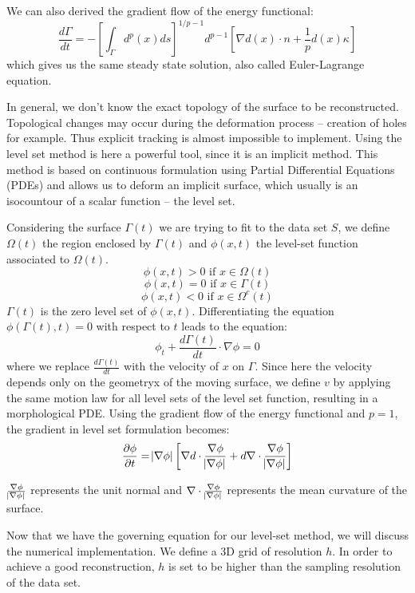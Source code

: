 \documentclass[a4paper]{article}
\begin{document}
We can also derived the gradient flow of the energy functional:
$$\frac{d\Gamma}{dt} = -\left[\int_{\Gamma} d^p(x)ds\right]^{1/p - 1}d^{p-1}[\nabla d(x) \cdot n +\frac{1}{p}d(x)\kappa]$$
which gives us the same steady state solution, also called Euler-Lagrange equation.

In general, we don't know the exact topology of the surface to be reconstructed. Topological changes may occur during the deformation process -- creation of holes for example. Thus explicit tracking is almost impossible to implement. Using the level set method is here a powerful tool, since it is an implicit method. This method is based on continuous formulation using Partial Differential Equations (PDEs) and allows us to deform an implicit surface, which usually is an isocountour of a scalar function -- the level set.

Considering the surface $\Gamma(t)$ we are trying to fit to the data set $S$, we define $\Omega(t)$ the region enclosed by $\Gamma(t)$ and $\phi(x,t)$ the level-set function associated to $\Omega(t)$.
$$\phi(x,t) > 0\text{ if } x\in\Omega(t)$$
$$\phi(x,t) = 0\text{ if } x\in\Gamma(t)$$
$$\phi(x,t) < 0\text{ if } x\in\Omega^c(t)$$
$\Gamma(t)$ is the zero level set of $\phi(x,t)$. Differentiating the equation $\phi(\Gamma(t),t) = 0$ with respect to $t$ leads to the equation:
$$\phi_t + \frac{d\Gamma(t)}{dt}\cdot\nabla\phi = 0$$
where we replace $\frac{d\Gamma(t)}{dt}$ with the velocity of $x$ on $\Gamma$. Since here the velocity depends only on the geometryx of the moving surface, we define $v$ by applying the same motion law for all level sets of the level set function, resulting in a morphological PDE. Using the gradient flow of the energy functional and $p = 1$, the gradient in level set formulation becomes:
$$\frac{\partial\phi}{\partial t} = \abs{\nabla\phi}\left[\nabla d \cdot \frac{\nabla\phi}{\abs{\nabla\phi}} + d\nabla\cdot\frac{\nabla\phi}{\abs{\nabla\phi}}\right]$$

$\frac{\nabla\phi}{\abs{\nabla\phi}}$ represents the unit normal and $\nabla\cdot\frac{\nabla\phi}{\abs{\nabla\phi}}$ represents the mean curvature of the surface.

Now that we have the governing equation for our level-set method, we will discuss the numerical implementation. We define a 3D grid of resolution $h$. In order to achieve a good reconstruction, $h$ is set to be higher than the sampling resolution of the data set.
\end{document}
